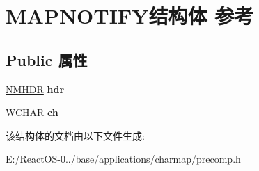 \hypertarget{struct_m_a_p_n_o_t_i_f_y}{}\section{M\+A\+P\+N\+O\+T\+I\+F\+Y结构体 参考}
\label{struct_m_a_p_n_o_t_i_f_y}
\subsection*{Public 属性}
\begin{DoxyCompactItemize}
\item 
\mbox{\label{struct_m_a_p_n_o_t_i_f_y_af2c18ab4596a9225238f61854148cabb}} 
\hyperlink{structtag_n_m_h_d_r}{N\+M\+H\+DR} {\bfseries hdr}
\item 
\mbox{\label{struct_m_a_p_n_o_t_i_f_y_a817a7044c4d42bbd248c39a65168bbaf}} 
W\+C\+H\+AR {\bfseries ch}
\end{DoxyCompactItemize}


该结构体的文档由以下文件生成\+:\begin{DoxyCompactItemize}
\item 
E\+:/\+React\+O\+S-\/0../base/applications/charmap/precomp.\+h\end{DoxyCompactItemize}
